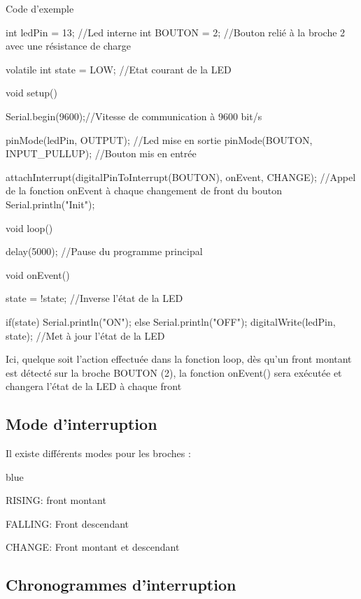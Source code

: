 \begin{Cpp}{Code d'exemple}

	int ledPin = 13;    //Led interne
	int BOUTON = 2;  //Bouton relié à la broche 2 avec une résistance de charge
	
	volatile int state = LOW;  //Etat courant de la LED
	
	void setup() {
	  
	  Serial.begin(9600);//Vitesse de communication à 9600 bit/s
	  
	  pinMode(ledPin, OUTPUT);                //Led mise en sortie
	  pinMode(BOUTON, INPUT_PULLUP);    //Bouton mis en entrée
	  
	  attachInterrupt(digitalPinToInterrupt(BOUTON), onEvent, CHANGE);  //Appel de la fonction onEvent à chaque changement de front du bouton
	  Serial.println("Init");
	}
	
	void loop() {
	  
	 delay(5000); //Pause du programme principal
	  
	}
	
	void onEvent() {
	  
	  state = !state; //Inverse l'état de la LED
	  
	  if(state){
		Serial.println("ON");
	  }else{
		Serial.println("OFF");
	  }
	   digitalWrite(ledPin, state); //Met à jour l'état de la LED
	}
	
\end{Cpp}


Ici, quelque soit l'action effectuée dans la fonction loop, dès qu'un front montant est détecté sur la broche BOUTON (2), 
la fonction onEvent() sera exécutée et changera l'état de la LED à chaque front



\subsection{Mode d'interruption}

Il existe différents modes pour les broches :

\begin{items}{blue}{\Bullet}
	\item RISING: front montant
	\item FALLING: Front descendant
	\item CHANGE: Front montant et descendant
\end{items}

\subsection{Chronogrammes d'interruption}


